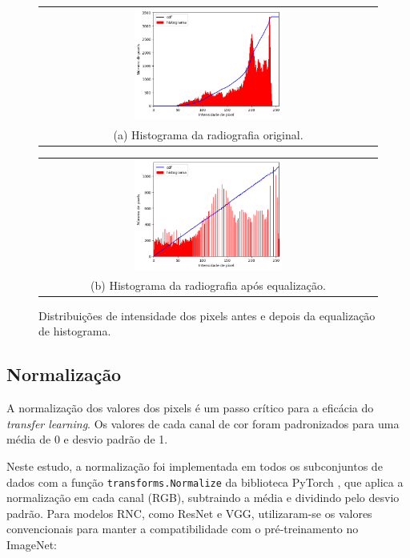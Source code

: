 \begin{figure}[ht]
    \centering
    \begin{tabular}{@{}c@{}}
        \includegraphics[width=0.45\textwidth]{figs/histograma-imagem-nao-equalizada.png} \\[\abovecaptionskip]
        \small (a) Histograma da radiografia original.
    \end{tabular}
    \hfill
    \begin{tabular}{@{}c@{}}
        \includegraphics[width=0.45\textwidth]{figs/histograma-imagem-equalizada.png} \\[\abovecaptionskip]
        \small (b) Histograma da radiografia após equalização.
    \end{tabular}
    \caption{Distribuições de intensidade dos pixels antes e depois da equalização de histograma.}
    \label{fig:histogram-equalization-histogram}
\end{figure}

\subsection{Normalização}

A normalização dos valores dos pixels é um passo crítico para a eficácia do \textit{transfer learning}. Os valores de cada canal de cor foram padronizados para uma média de 0 e desvio padrão de 1.

Neste estudo, a normalização foi implementada em todos os subconjuntos de dados com a função \texttt{transforms.Normalize} da biblioteca PyTorch \citep{pytorch}, que aplica a normalização em cada canal (RGB), subtraindo a média e dividindo pelo desvio padrão. Para modelos RNC, como ResNet e VGG, utilizaram-se os valores convencionais para manter a compatibilidade com o pré-treinamento no ImageNet:

